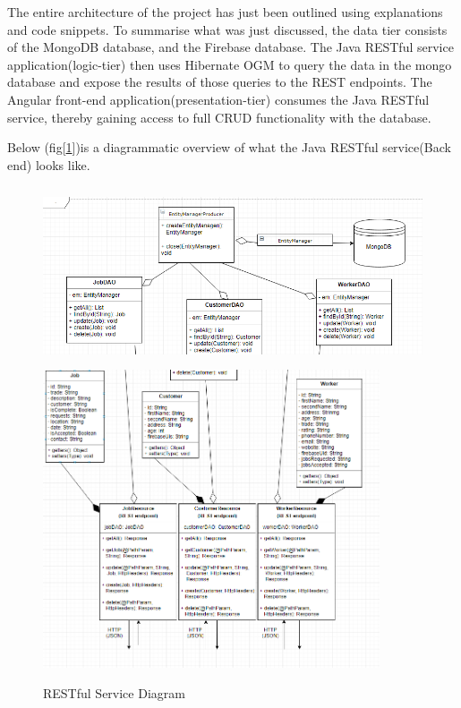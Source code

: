 The entire architecture of the project has just been outlined using explanations and code snippets. To summarise what was just discussed, the data tier consists of the MongoDB database, and the Firebase database. The Java RESTful service application(logic-tier) then uses Hibernate OGM to query the data in the mongo database and expose the results of those queries to the REST endpoints. The Angular front-end application(presentation-tier) consumes the Java RESTful service, thereby gaining access to full CRUD functionality with the database. 



Below (fig[\ref{fig:back}])is a diagrammatic overview of what the Java RESTful service(Back end) looks like.

\begin{figure}[H]
    \centering
    \includegraphics[width=\textwidth, height=150pt]{DesignImages/Server2.PNG}
    \includegraphics[width=\textwidth, height=250pt]{DesignImages/Server1.PNG}
    \caption{RESTful Service Diagram}
    \label{fig:back}
\end{figure}


